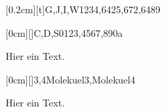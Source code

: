\documentclass[./main.tex]{subfiles}
\begin{document}


\kastenarray{2.5cm}{3cm}[0.2cm][t]{G,J,I,W}{1234,6425,672,6489}

\kastenarray{3cm}{4cm}[0cm][]{C,D,S}{0123,4567,890a}

Hier ein Text. 


\kastenarray{7cm}{7cm}[0cm][]{3,4}{Molekuel3,Molekuel4}

Hier ein Text.
\newpage
\aufgabenende
\end{document}
